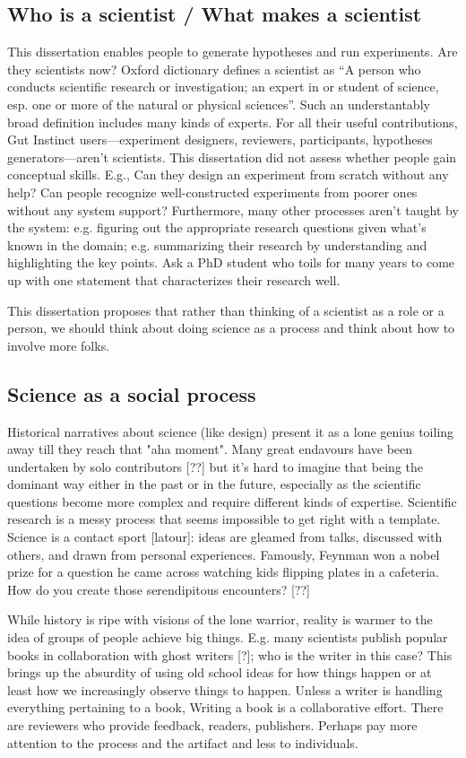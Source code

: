 \subsection{Who is a scientist / What makes a scientist}
This dissertation enables people to generate hypotheses and run experiments. Are they scientists now? Oxford dictionary defines a scientist as “A person who conducts scientific research or investigation; an expert in or student of science, esp. one or more of the natural or physical sciences”. Such an understantably broad definition includes many kinds of experts. For all their useful contributions, Gut Instinct users---experiment designers, reviewers, participants, hypotheses generators---aren't scientists. This dissertation did not assess whether people gain conceptual skills. E.g., Can they design an experiment from scratch without any help? Can people recognize well-constructed experiments from poorer ones without any system support? Furthermore, many other processes aren't taught by the system: e.g. figuring out the appropriate research questions given what’s known in the domain; e.g. summarizing their research by understanding and highlighting the key points. Ask a PhD student who toils for many years to come up with one statement that characterizes their research well.

This dissertation proposes that rather than thinking of a scientist as a role or a person, we should think about doing science as a process and think about how to involve more folks. 

\subsection{Science as a social process}
Historical narratives about science (like design) present it as a lone genius toiling away till they reach that "aha moment". Many great endavours have been undertaken by solo contributors [??] but it's hard to imagine that being the dominant way either in the past or in the future, especially as the scientific questions become more complex and require different kinds of expertise. Scientific research is a messy process that seems impossible to get right with a template. Science is a contact sport [latour]: ideas are gleamed from talks, discussed with others, and drawn from personal experiences. Famously, Feynman won a nobel prize for a question he came across watching kids flipping plates in a cafeteria. How do you create those serendipitous encounters? [??]

While history is ripe with visions of the lone warrior, reality is warmer to the idea of groups of people achieve big things. E.g. many scientists publish popular books in collaboration with ghost writers [?]; who is the writer in this case? This brings up the absurdity of using old school ideas for how things happen or at least how we increasingly observe things to happen. Unless a writer is handling everything pertaining to a book, Writing a book is a collaborative effort. There are reviewers who provide feedback, readers, publishers. Perhaps pay more attention to the process and the artifact and less to individuals.

